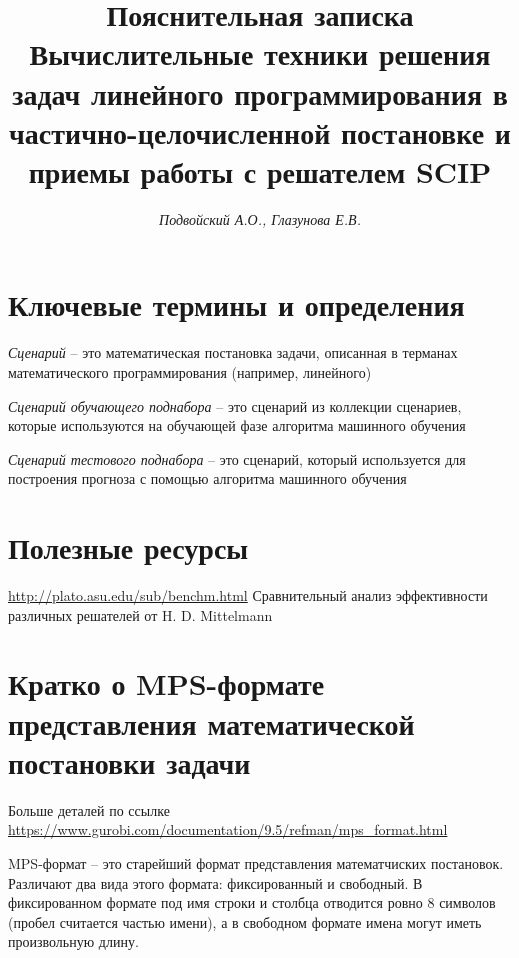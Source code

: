 \documentclass[%
	11pt,
	a4paper,
	utf8,
		]{article}
\begin{document}
\title{Пояснительная записка\\{\large Вычислительные техники решения задач линейного программирования в частично-целочисленной постановке и приемы работы с решателем SCIP}}

\author{\itshape Подвойский А.О., Глазунова Е.В.}


\date{}
\maketitle

\thispagestyle{fancy}



\tableofcontents

\section{Ключевые термины и определения}

\emph{Сценарий} -- это математическая постановка задачи, описанная в терманах математического программирования (например, линейного)

\emph{Сценарий обучающего поднабора} -- это сценарий из коллекции сценариев, которые используются на {обучающей фазе} алгоритма машинного обучения

\emph{Сценарий тестового поднабора} -- это сценарий, который используется {для построения прогноза} с помощью алгоритма машинного обучения

\section{Полезные ресурсы}

\url{http://plato.asu.edu/sub/benchm.html} Сравнительный анализ эффективности различных решателей от H. D. Mittelmann

\section{Кратко о MPS-формате представления математической постановки задачи}

Больше деталей по ссылке \url{https://www.gurobi.com/documentation/9.5/refman/mps_format.html}

MPS-формат -- это старейший формат представления математчиских постановок. Различают два вида этого формата: фиксированный и свободный. В фиксированном формате под имя строки и столбца отводится ровно 8 символов (пробел считается частью имени), а в свободном формате имена могут иметь произвольную длину.
\end{document}
